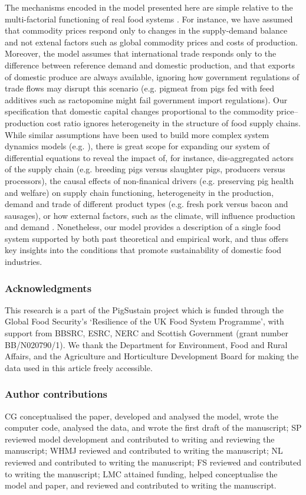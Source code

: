 \documentclass[12pt]{article}
\begin{document}
The mechanisms encoded in the model presented here are simple relative to the multi-factorial functioning of real food systems \cite{ericksen2008,ingram2011}. For instance, we have assumed that commodity prices respond only to changes in the supply-demand balance and not extenal factors such as global commodity prices and costs of production. Moreover, the model assumes that international trade responds only to the difference between reference demand and domestic production, and that exports of domestic produce are always available, ignoring how government regulations of trade flows may disrupt this scenario (e.g. pigmeat from pigs fed with feed additives such as ractopomine might fail government import regulations). Our specification that domestic capital changes proportional to the commodity price--production cost ratio \cite{sterman2000} ignores heterogeneity in the structure of food supply chains. While similar assumptions have been used to build more complex system dynamics models (e.g. \cite{meadows1971,sterman2000}), there is great scope for expanding our system of differential equations to reveal the impact of, for instance, dis-aggregated actors of the supply chain (e.g. breeding pigs versus slaughter pigs, producers versus processors), the causal effects of non-finanical drivers (e.g. preserving pig health and welfare) on supply chain functioning, heterogeneity in the production, demand and trade of different product types (e.g. fresh pork versus bacon and sausages), or how external factors, such as the climate, will influence production and demand \cite{vermeulen2012}. Nonetheless, our model provides a description of a single food system supported by both past theoretical and empirical work, and thus offers key insights into the conditions that promote sustainability of domestic food industries.

\subsubsection*{Acknowledgments}
This research is a part of the PigSustain project which is funded through the Global Food Security's `Resilience of the UK Food System Programme', with support from BBSRC, ESRC, NERC and Scottish Government (grant number BB/N020790/1). We thank the Department for Environment, Food and Rural Affairs, and the Agriculture and Horticulture Development Board for making the data used in this article freely accessible.

\subsubsection*{Author contributions}
CG conceptualised the paper, developed and analysed the model, wrote the computer code, analysed the data, and wrote the first draft of the manuscript; SP reviewed model development and contributed to writing and reviewing the manuscript; WHMJ reviewed and contributed to writing the manuscript; NL reviewed and contributed to writing the manuscript; FS reviewed and contributed to writing the manuscript; LMC attained funding, helped conceptualise the model and paper, and reviewed and contributed to writing the manuscript.
\end{document}
